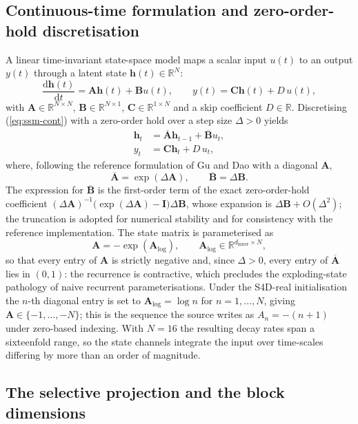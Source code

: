 \documentclass[11pt,a4paper]{article}
\newcommand{\R}{\mathbb{R}}
\newcommand{\vh}{\bm{h}}
\newcommand{\mA}{\bm{A}}
\newcommand{\mB}{\bm{B}}
\newcommand{\mC}{\bm{C}}
\newcommand{\Abar}{\overline{\bm{A}}}
\newcommand{\Bbar}{\overline{\bm{B}}}
\begin{document}
\subsection{Continuous-time formulation and zero-order-hold discretisation}

A linear time-invariant state-space model maps a scalar input $u(t)$ to
an output $y(t)$ through a latent state $\vh(t)\in\R^{N}$:
\begin{equation}
\frac{\mathrm{d}\vh(t)}{\mathrm{d}t}=\mA\vh(t)+\mB u(t),
\qquad
y(t)=\mC\vh(t)+D\,u(t),
\label{eq:ssm-cont}
\end{equation}
with $\mA\in\R^{N\times N}$, $\mB\in\R^{N\times1}$,
$\mC\in\R^{1\times N}$ and a skip coefficient $D\in\R$. Discretising
(\ref{eq:ssm-cont}) with a zero-order hold over a step size $\Delta>0$
yields
\begin{align}
\vh_{t}&=\Abar\vh_{t-1}+\Bbar u_{t}, \label{eq:ssm-disc-h}\\
y_{t}&=\mC\vh_{t}+D\,u_{t}, \label{eq:ssm-disc-y}
\end{align}
where, following the reference formulation of Gu and Dao with a
diagonal $\mA$,
\begin{equation}
\Abar=\exp(\Delta\mA),
\qquad
\Bbar=\Delta\mB.
\label{eq:zoh}
\end{equation}
The expression for $\Bbar$ is the first-order term of the exact
zero-order-hold coefficient
$(\Delta\mA)^{-1}\bigl(\exp(\Delta\mA)-\bm{I}\bigr)\Delta\mB$, whose
expansion is $\Delta\mB+O(\Delta^{2})$; the truncation is adopted for
numerical stability and for consistency with the reference
implementation. The state matrix is parameterised as
\begin{equation}
\mA=-\exp(\mA_{\log}),\qquad
\mA_{\log}\in\R^{d_{\mathrm{inner}}\times N},
\label{eq:Alog}
\end{equation}
so that every entry of $\mA$ is strictly negative and, since
$\Delta>0$, every entry of $\Abar$ lies in $(0,1)$: the recurrence is
contractive, which precludes the exploding-state pathology of naive
recurrent parameterisations. Under the S4D-real initialisation the
$n$-th diagonal entry is set to $\mA_{\log}=\log n$ for
$n=1,\dots,N$, giving $\mA\in\{-1,\dots,-N\}$; this is the sequence the
source writes as $A_{n}=-(n+1)$ under zero-based indexing. With $N=16$
the resulting decay rates span a sixteenfold range, so the state
channels integrate the input over time-scales differing by more than an
order of magnitude.

\subsection{The selective projection and the block dimensions}
\end{document}
